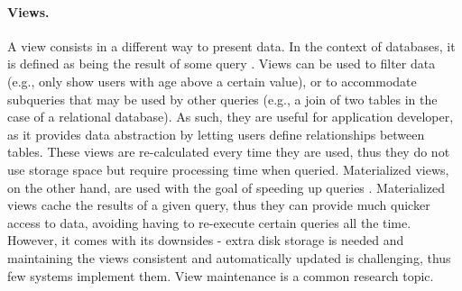 \paragraph{Views.}
A view consists in a different way to present data.
In the context of databases, it is defined as being the result of some query \cite{txcache}. %
Views can be used to filter data (e.g., only show users with age above a certain value), or to accommodate subqueries that may be used by other queries (e.g., a join of two tables in the case of a relational database).
As such, they are useful for application developer, as it provides data abstraction by letting users define relationships between tables.
These views are re-calculated every time they are used, thus they do not use storage space but require processing time when queried.
Materialized views, on the other hand, are used with the goal of speeding up queries \cite{noria, pequod, txcache, partView, viewSelection, incMaintenance, effMaintenance, lazyMaintenance}. %
Materialized views cache the results of a given query, thus they can provide much quicker access to data, avoiding having to re-execute certain queries all the time.
However, it comes with its downsides - extra disk storage is needed and maintaining the views consistent and automatically updated is challenging, thus few systems implement them.
View maintenance is a common research topic.  %

